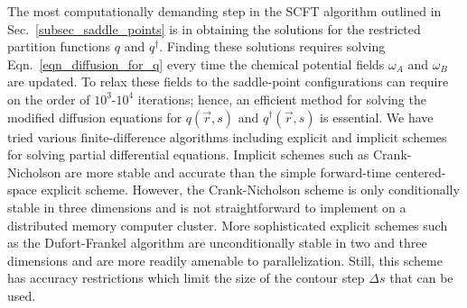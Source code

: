 \documentclass[onecolumn,amsmath,amssymb,floatfix]{elsart}
\begin{document}
The most computationally demanding step in the SCFT algorithm
outlined in Sec.~\ref{subsec_saddle_points} is in obtaining the
solutions for the restricted partition functions
$q$ and $q^\dag$.
Finding these solutions requires solving
Eqn.~\ref{eqn_diffusion_for_q} every time the chemical potential
fields $\omega_A$ and $\omega_B$ are updated.
To relax these
fields to the saddle-point configurations can require on the order
of $10^3$-$10^4$ iterations; hence, an efficient method for
solving the modified diffusion equations for $q({\vec r},s)$ and
$q^{\dagger}({\vec r},s)$ is essential.
We have tried various
finite-difference algorithms including explicit and implicit
schemes \cite{caj_fletcher_book} for solving partial differential
equations.
Implicit schemes such as Crank-Nicholson are more
stable and accurate than the simple forward-time centered-space
explicit scheme.
However, the Crank-Nicholson scheme is only
conditionally stable in three dimensions and is not
straightforward to implement on a distributed memory computer
cluster.
More sophisticated explicit schemes such as the
Dufort-Frankel algorithm are unconditionally stable in two and
three dimensions and are more readily amenable to parallelization.
Still, this scheme has accuracy restrictions which limit the size
of the contour step $\Delta s$ that can be used.
\end{document}
